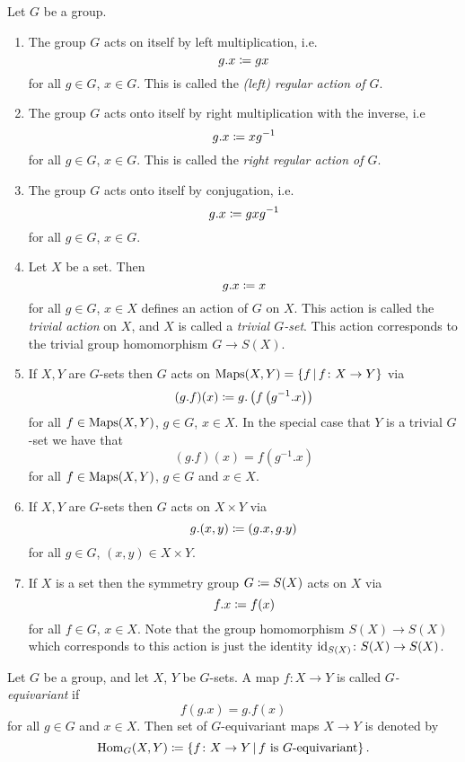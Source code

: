 \begin{example}
  Let $G$ be a group.
  \begin{enumerate}
    \item
      The group $G$ acts on itself by left multiplication, i.e.\
      \[
                  g.x
        \coloneqq  gx
      \]
      for all $g \in G$, $x \in G$.
      This is called the \emph{\textup(left\textup) regular action of $G$}.
    \item
      The group $G$ acts onto itself by right multiplication with the inverse, i.e\
      \[
                  g.x
        \coloneqq  xg^{-1}
      \]
      for all $g \in G$, $x \in G$.
      This is called the \emph{right regular action of $G$}.
    \item
      The group $G$ acts onto itself by conjugation, i.e.\
      \[
                  g.x
        \coloneqq  gxg^{-1}
      \]
      for all $g \in G$, $x \in G$.
    \item
      Let $X$ be a set.
      Then
      \[
                  g.x
        \coloneqq  x
      \]
      for all $g \in G$, $x \in X$ defines an action of $G$ on $X$.
      This action is called the \emph{trivial action} on $X$, and $X$ is called a \emph{trivial $G$-set}.
      This action corresponds to the trivial group homomorphism $G \to S(X)$.
    \item
      If $X, Y$ are $G$-sets then $G$ acts on $\Maps(X,Y) = \{f \suchthat f \colon X \to Y\}$ via
      \[
                  (g.f)(x)
        \coloneqq g.\left( f\left( g^{-1}.x \right) \right)
      \]
      for all $f \in \operatorname{Maps}(X,Y)$, $g \in G$, $x \in X$.
      In the special case that $Y$ is a trivial $G$-set we have that
      \[
          (g.f)(x)
        = f(g^{-1}.x)
      \]
      for all $f \in \operatorname{Maps}(X,Y)$, $g \in G$ and $x \in X$.
    \item
      If $X, Y$ are $G$-sets then $G$ acts on $X \times Y$ via
      \[
                  g.(x,y)
        \coloneqq (g.x,g.y)
      \]
      for all $g \in G$, $(x,y) \in X \times Y$.
    \item
      If $X$ is a set then the symmetry group $G \coloneqq S(X)$ acts on $X$ via
      \[
                  f.x
        \coloneqq  f(x)
      \]
      for all $f \in G$, $x \in X$.
      Note that the group homomorphism $S(X) \to S(X)$ which corresponds to this action is just the identity $\operatorname{id}_{S(X)} \colon S(X) \to S(X)$.
  \end{enumerate}
\end{example}


\begin{definition}
  Let $G$ be a group, and let $X$, $Y$ be $G$-sets.
  A map $f \colon X \to Y$ is called \emph{$G$-equivariant} if
  \[
      f(g.x)
    = g.f(x)
  \]
  for all $g \in G$ and $x \in X$.
  Then set of $G$-equivariant maps $X \to Y$ is denoted by
  \[
              \Hom_G(X,Y)
    \defined  \{
                f \colon X \to Y
              \suchthat
                \text{$f$ is $G$-equivariant}
              \} \,.
  \]
\end{definition}


